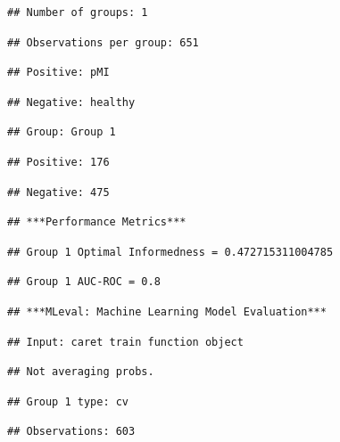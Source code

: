 \documentclass[
]{article}
\begin{document}
\begin{verbatim}
## Number of groups: 1
\end{verbatim}

\begin{verbatim}
## Observations per group: 651
\end{verbatim}

\begin{verbatim}
## Positive: pMI
\end{verbatim}

\begin{verbatim}
## Negative: healthy
\end{verbatim}

\begin{verbatim}
## Group: Group 1
\end{verbatim}

\begin{verbatim}
## Positive: 176
\end{verbatim}

\begin{verbatim}
## Negative: 475
\end{verbatim}

\begin{verbatim}
## ***Performance Metrics***
\end{verbatim}

\begin{verbatim}
## Group 1 Optimal Informedness = 0.472715311004785
\end{verbatim}

\begin{verbatim}
## Group 1 AUC-ROC = 0.8
\end{verbatim}

\begin{verbatim}
## ***MLeval: Machine Learning Model Evaluation***
\end{verbatim}

\begin{verbatim}
## Input: caret train function object
\end{verbatim}

\begin{verbatim}
## Not averaging probs.
\end{verbatim}

\begin{verbatim}
## Group 1 type: cv
\end{verbatim}

\begin{verbatim}
## Observations: 603
\end{verbatim}
\end{document}
